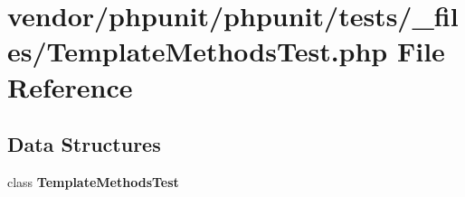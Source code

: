 \section{vendor/phpunit/phpunit/tests/\+\_\+files/\+Template\+Methods\+Test.php File Reference}
\label{_template_methods_test_8php}
\subsection*{Data Structures}
\begin{DoxyCompactItemize}
\item 
class {\bf Template\+Methods\+Test}
\end{DoxyCompactItemize}
